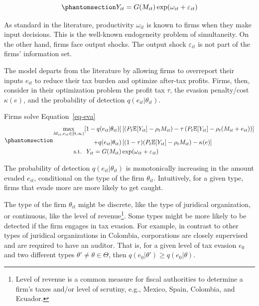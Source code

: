 \documentclass[
  12pt]{article}
\theoremstyle{definition}
\theoremstyle{remark}
\begin{document}
\begin{equation}\phantomsection\label{eq-prod-fn}{
Y_{it}=G(M_{it})\exp(\omega_{it}+\varepsilon_{it})
}\end{equation}

As standard in the literature, productivity \(\omega_{it}\) is known to
firms when they make input decisions. This is the well-known endogeneity
problem of simultaneity. On the other hand, firms face output shocks.
The output shock \(\varepsilon_{it}\) is not part of the firms'
information set.

The model departs from the literature by allowing firms to overreport
their inputs \(e_{it}\) to reduce their tax burden and optimize
after-tax profits. Firms, then, consider in their optimization problem
the profit tax \(\tau\), the evasion penalty/cost \(\kappa(e)\), and the
probability of detection \(q(e_{it}|\theta_{it})\).

Firms solve Equation~\ref{eq-eva}
\begin{equation}\phantomsection\label{eq-eva}{
\begin{aligned}
  \max_{M_{it}, e_{it}\in [0,\infty)} [1-q(e_{it}|\theta_{it})]&\left[(P_t\mathbb{E}[Y_{it}]-\rho_{t} M_{it})-\tau\left(P_t\mathbb{E}[Y_{it}]-\rho_{t} (M_{it}+e_{it})\right)\right]\\
  +q(e_{it}|\theta_{it})&\left[(1-\tau)(P_t\mathbb{E}[Y_{it}]-\rho_{t} M_{it})-\kappa(e)\right] \\
  \text{s.t. }\; Y_{it}=G(M_{it})&\exp(\omega_{it}+\varepsilon_{it})
\end{aligned}
}\end{equation}

The probability of detection \(q(e_{it}|\theta_{it})\) is monotonically
increasing in the amount evaded \(e_{it}\), conditional on the type of
the firm \(\theta_{it}\). Intuitively, for a given type, firms that
evade more are more likely to get caught.

The type of the firm \(\theta_{it}\) might be discrete, like the type of
juridical organization, or continuous, like the level of
revenue\footnote{Level of revenue is a common measure for fiscal
  authorities to determine a firm's taxes and/or level of scrutiny,
  e.g., Mexico, Spain, Colombia, and Ecuador. }. Some
types might be more likely to be detected if the firm engages in tax
evasion. For example, in contrast to other types of juridical
organizations in Colombia, corporations are closely supervised and are
required to have an auditor. That is, for a given level of tax evasion
\(e_0\) and two different types
\(\theta' \not= \theta \in \mathbfcal{\Theta}\), then
\(q(e_0|\theta')\ge q(e_0|\theta)\).
\end{document}
